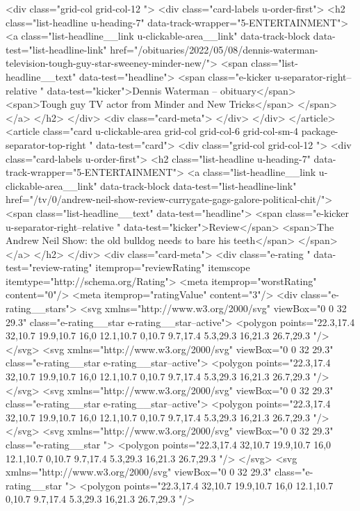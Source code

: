 {{{<div class="grid-col grid-col-12  ">
<div class="card-labels u-order-first">
<h2 class="list-headline  u-heading-7" data-track-wrapper="5-ENTERTAINMENT">
<a class="list-headline__link u-clickable-area__link" data-track-block data-test="list-headline-link" href="/obituaries/2022/05/08/dennis-waterman-television-tough-guy-star-sweeney-minder-new/">
<span class="list-headline__text" data-test="headline">
<span class="e-kicker u-separator-right--relative " data-test="kicker">Dennis Waterman – obituary</span>
<span>Tough guy TV actor from Minder and New Tricks</span>
</span>
</a>
</h2>
</div>
<div class="card-meta">
</div>
</div>
</article>
<article class="card u-clickable-area grid-col grid-col-6 grid-col-sm-4 package-separator-top-right " data-test="card">
<div class="grid-col grid-col-12  ">
<div class="card-labels u-order-first">
<h2 class="list-headline  u-heading-7" data-track-wrapper="5-ENTERTAINMENT">
<a class="list-headline__link u-clickable-area__link" data-track-block data-test="list-headline-link" href="/tv/0/andrew-neil-show-review-currygate-gags-galore-political-chit/">
<span class="list-headline__text" data-test="headline">
<span class="e-kicker u-separator-right--relative " data-test="kicker">Review</span>
<span>The Andrew Neil Show: the old bulldog needs to bare his teeth</span>
</span>
</a>
</h2>
</div>
<div class="card-meta">
<div class="e-rating " data-test="review-rating" itemprop="reviewRating" itemscope itemtype="http://schema.org/Rating">
<meta itemprop="worstRating" content="0"/>
<meta itemprop="ratingValue" content="3"/>
<div class="e-rating__stars">
<svg xmlns="http://www.w3.org/2000/svg" viewBox="0 0 32 29.3" class="e-rating__star  e-rating__star--active">
<polygon points="22.3,17.4 32,10.7 19.9,10.7 16,0 12.1,10.7 0,10.7 9.7,17.4 5.3,29.3 16,21.3 26.7,29.3 "/>
</svg>
<svg xmlns="http://www.w3.org/2000/svg" viewBox="0 0 32 29.3" class="e-rating__star  e-rating__star--active">
<polygon points="22.3,17.4 32,10.7 19.9,10.7 16,0 12.1,10.7 0,10.7 9.7,17.4 5.3,29.3 16,21.3 26.7,29.3 "/>
</svg>
<svg xmlns="http://www.w3.org/2000/svg" viewBox="0 0 32 29.3" class="e-rating__star  e-rating__star--active">
<polygon points="22.3,17.4 32,10.7 19.9,10.7 16,0 12.1,10.7 0,10.7 9.7,17.4 5.3,29.3 16,21.3 26.7,29.3 "/>
</svg>
<svg xmlns="http://www.w3.org/2000/svg" viewBox="0 0 32 29.3" class="e-rating__star  ">
<polygon points="22.3,17.4 32,10.7 19.9,10.7 16,0 12.1,10.7 0,10.7 9.7,17.4 5.3,29.3 16,21.3 26.7,29.3 "/>
</svg>
<svg xmlns="http://www.w3.org/2000/svg" viewBox="0 0 32 29.3" class="e-rating__star  ">
<polygon points="22.3,17.4 32,10.7 19.9,10.7 16,0 12.1,10.7 0,10.7 9.7,17.4 5.3,29.3 16,21.3 26.7,29.3 "/>
}}}
